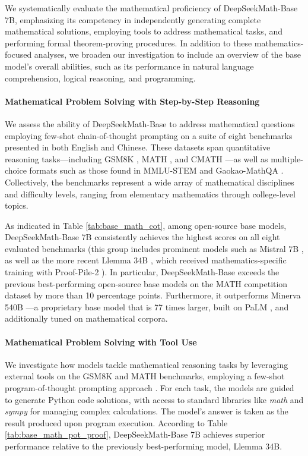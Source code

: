 \begin{itemize}[topsep=0pt]
We systematically evaluate the mathematical proficiency of DeepSeekMath-Base 7B, emphasizing its competency in independently generating complete mathematical solutions, employing tools to address mathematical tasks, and performing formal theorem-proving procedures. In addition to these mathematics-focused analyses, we broaden our investigation to include an overview of the base model's overall abilities, such as its performance in natural language comprehension, logical reasoning, and programming.

\paragraph{Mathematical Problem Solving with Step-by-Step Reasoning}

We assess the ability of DeepSeekMath-Base to address mathematical questions employing few-shot chain-of-thought prompting \citep{cot} on a suite of eight benchmarks presented in both English and Chinese. These datasets span quantitative reasoning tasks—including GSM8K \citep{gsm8k}, MATH \citep{MATH}, and CMATH \citep{wei2023cmath}—as well as multiple-choice formats such as those found in MMLU-STEM \citep{mmlu} and Gaokao-MathQA \citep{agieval}. Collectively, the benchmarks represent a wide array of mathematical disciplines and difficulty levels, ranging from elementary mathematics through college-level topics.

As indicated in Table \ref{tab:base_math_cot}, among open-source base models, DeepSeekMath-Base 7B consistently achieves the highest scores on all eight evaluated benchmarks (this group includes prominent models such as Mistral 7B \citep{mistral}, as well as the more recent Llemma 34B \citep{llemma}, which received mathematics-specific training with Proof-Pile-2 \citep{llemma}). In particular, DeepSeekMath-Base exceeds the previous best-performing open-source base models on the MATH competition dataset by more than 10 percentage points. Furthermore, it outperforms Minerva 540B \citep{minerva}—a proprietary base model that is 77 times larger, built on PaLM \citep{palm}, and additionally tuned on mathematical corpora.

\paragraph{Mathematical Problem Solving with Tool Use} We investigate how models tackle mathematical reasoning tasks by leveraging external tools on the GSM8K and MATH benchmarks, employing a few-shot program-of-thought prompting approach \citep{pot,pal}. For each task, the models are guided to generate Python code solutions, with access to standard libraries like \textit{math} and \textit{sympy} for managing complex calculations. The model’s answer is taken as the result produced upon program execution. According to Table \ref{tab:base_math_pot_proof}, DeepSeekMath-Base 7B achieves superior performance relative to the previously best-performing model, Llemma 34B.


\end{itemize}
